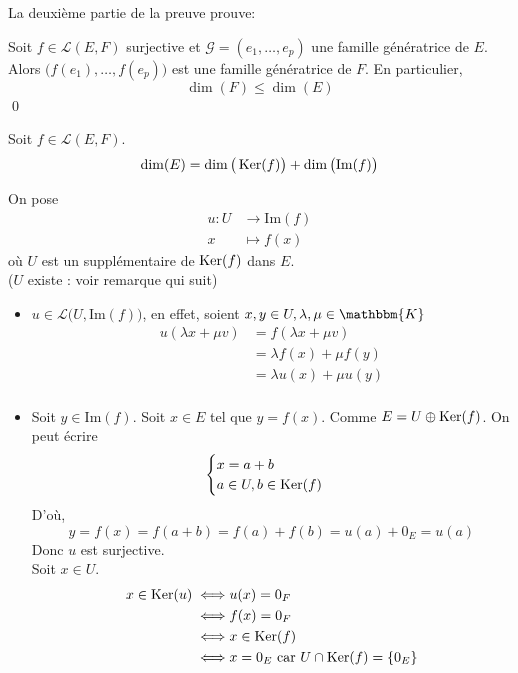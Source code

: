 La deuxième partie de la preuve prouve: \\[3mm]

\begin{prop}
	Soit $f \in \mathcal{L}(E,F)$ surjective et $\mathcal{G} = (e_1, \ldots, e_p)$ une famille génératrice de $E$. Alors $\big(f(e_1), \ldots, f(e_p)\big)$ est une famille génératrice de $F$. En particulier, \[
		\dim(F) \le \dim(E)
	\]\qed
\end{prop}

\begin{thm}
	 Soit $f \in \mathcal{L}(E, F)$. \[
		\dim(E) = \dim\big(\operatorname{Ker}(f)\big) + \dim\big(\mathrm{Im}(f)\big)
	\]
\end{thm}

\begin{prv}
	[À connaître]
	On pose \begin{align*}
		u: U &\longrightarrow \mathrm{Im}(f) \\
		x &\longmapsto f(x)
	\end{align*} où $U$ est un supplémentaire de $\operatorname{Ker}(f)$ dans $E$.\\
	($U$ existe : voir remarque qui suit)
	\begin{itemize}
		\item $u \in \mathcal{L}\big(U, \mathrm{Im}(f)\big)$, en effet, soient $x,y \in U, \lambda, \mu \in \mathbbm{K}$\\
			\begin{align*}
				u(\lambda x + \mu v) &= f(\lambda x + \mu v)\\
				&= \lambda f(x) + \mu f(y) \\
				&= \lambda u(x) + \mu u (y)\\
			\end{align*}
		\item Soit $y \in \mathrm{Im}(f)$. Soit $x \in E$ tel que $y = f(x)$. Comme $E = U \oplus \operatorname{Ker}(f)$. On peut écrire \[
			\begin{cases}
				 x = a+b\\
				 a \in U, b \in \operatorname{Ker}(f)
			\end{cases}
		\]
		D'où, \[
			y = f(x) = f(a + b) = f(a) + f(b) = u(a) + 0_E = u(a)
		\] Donc $u$ est surjective.\\
		Soit $x \in U$.
		\begin{align*}
			x \in \Ker(u) \iff& u(x) = 0_F\\
			\iff& f(x) = 0_F\\
			\iff&x \in \Ker(f)\\
			\iff& x = 0_E \text{ car } U \cap \Ker(f) = \{0_E\}

\end{align*}
\end{itemize}
\end{prv}
